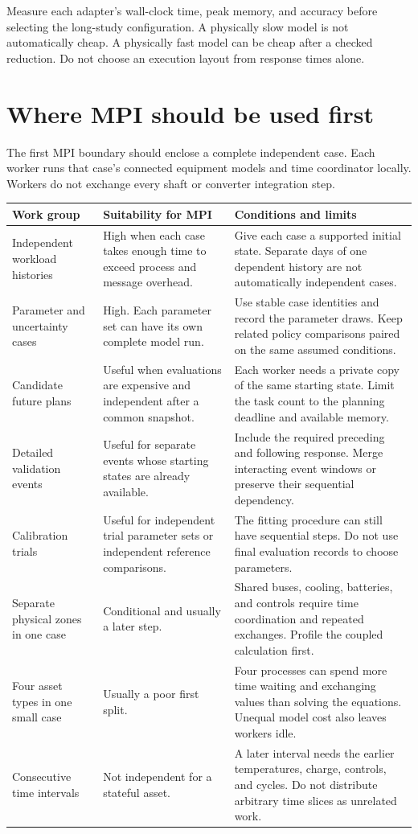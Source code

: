 \documentclass[11pt,a4paper]{report}
\begin{document}
Measure each adapter's wall-clock time, peak memory, and accuracy before selecting the long-study configuration.
A physically slow model is not automatically cheap.
A physically fast model can be cheap after a checked reduction.
Do not choose an execution layout from response times alone.

\section{Where MPI should be used first}
The first MPI boundary should enclose a complete independent case.
Each worker runs that case's connected equipment models and time coordinator locally.
Workers do not exchange every shaft or converter integration step.

\begin{longtable}{L{0.20\textwidth}L{0.32\textwidth}L{0.36\textwidth}}
\toprule Work group & Suitability for MPI & Conditions and limits \\ \midrule\endhead
Independent workload histories & High when each case takes enough time to exceed process and message overhead. & Give each case a supported initial state. Separate days of one dependent history are not automatically independent cases. \\
Parameter and uncertainty cases & High. Each parameter set can have its own complete model run. & Use stable case identities and record the parameter draws. Keep related policy comparisons paired on the same assumed conditions. \\
Candidate future plans & Useful when evaluations are expensive and independent after a common snapshot. & Each worker needs a private copy of the same starting state. Limit the task count to the planning deadline and available memory. \\
Detailed validation events & Useful for separate events whose starting states are already available. & Include the required preceding and following response. Merge interacting event windows or preserve their sequential dependency. \\
Calibration trials & Useful for independent trial parameter sets or independent reference comparisons. & The fitting procedure can still have sequential steps. Do not use final evaluation records to choose parameters. \\
Separate physical zones in one case & Conditional and usually a later step. & Shared buses, cooling, batteries, and controls require time coordination and repeated exchanges. Profile the coupled calculation first. \\
Four asset types in one small case & Usually a poor first split. & Four processes can spend more time waiting and exchanging values than solving the equations. Unequal model cost also leaves workers idle. \\
Consecutive time intervals & Not independent for a stateful asset. & A later interval needs the earlier temperatures, charge, controls, and cycles. Do not distribute arbitrary time slices as unrelated work. \\
\bottomrule
\end{longtable}
\end{document}
